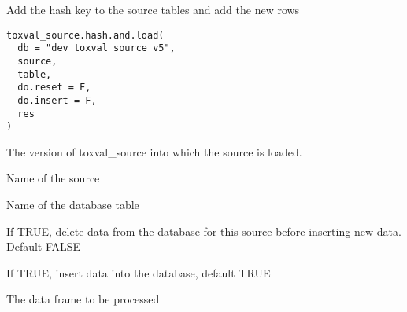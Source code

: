\documentclass[letterpaper]{book}
\begin{document}
%
\begin{Description}\relax
Add the hash key to the source tables and add the new rows
\end{Description}
%
\begin{Usage}
\begin{verbatim}
toxval_source.hash.and.load(
  db = "dev_toxval_source_v5",
  source,
  table,
  do.reset = F,
  do.insert = F,
  res
)
\end{verbatim}
\end{Usage}
%
\begin{Arguments}
\begin{ldescription}
\item[\code{db}] The version of toxval\_source into which the source is loaded.

\item[\code{source}] Name of the source

\item[\code{table}] Name of the database table

\item[\code{do.reset}] If TRUE, delete data from the database for this source before
inserting new data. Default FALSE

\item[\code{do.insert}] If TRUE, insert data into the database, default TRUE

\item[\code{res}] The data frame to be processed
\end{ldescription}
\end{Arguments}
\printindex{}
\end{document}
